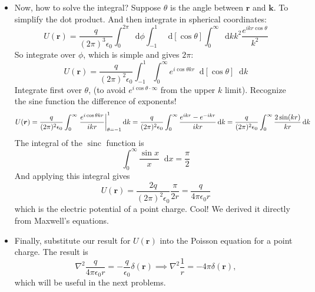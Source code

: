 \documentclass[11pt, a4paper]{article}
\newcommand{\diff}{\mathop{}\!\mathrm{d}} %
\renewcommand{\vec}[1]{\bm{#1}} %
\renewcommand{\r}{\vec{r}}
\newcommand{\e}{\epsilon_{0}}  %
\renewcommand{\laplacian}{\nabla^{2}}
\begin{document}
\begin{itemize}
	\item Now, how to solve the integral? Suppose $ \theta $ is the angle between $ \r $ and $ \vec{k} $. To simplify the dot product. And then integrate in spherical coordinates:
	\begin{equation*}
		U(\r) =  \frac{q}{(2\pi)^{3}\epsilon_{0}} \int_{0}^{2\pi}\diff \phi \int_{-1}^{1} \diff [\cos \theta] \int_{0}^{\infty} \diff k k^{2} \frac{e^{ik r\cos \theta}}{k^{2}} 
	\end{equation*}
	So integrate over $ \phi $, which is simple and gives $ 2\pi $:
	\begin{equation*}
		U(\r) = \frac{q}{(2\pi)^{2}\epsilon_{0}} \int_{-1}^{1}\int_{0}^{\infty} e^{i \cos \theta k r} \diff[\cos \theta] \diff k
	\end{equation*}
	Integrate first over $ \theta $, (to avoid $ e^{i \cos \theta \cdot \infty} $ from the upper $ k $ limit). Recognize the sine function the difference of exponents!
	\begin{equation*}
		U(\r) = \frac{q}{(2\pi)^{2}\epsilon_{0}} \int_{0}^{\infty} \eval{\frac{e^{i \cos \theta k r}}{i k r}}_{\theta = -1}^{1} \diff k = \frac{q}{(2\pi)^{2}\epsilon_{0}} \int_{0}^{\infty}\frac{e^{ikr}-e^{-ikr}}{ikr} \diff k = \frac{q}{(2\pi)^{2}\epsilon_{0}} \int_{0}^{\infty}\frac{2\sin (kr)}{kr} \diff k
	\end{equation*}
	The integral of the $ \operatorname{sinc} $ function is
	\begin{equation*}
		\int_{0}^{\infty} \frac{\sin x}{x}\diff x = \frac{\pi}{2}
	\end{equation*}
	And applying this integral gives
	\begin{equation*}
		U(\r) = \frac{2q}{(2\pi)^{2}\epsilon_{0}}\frac{\pi}{2r} = \frac{q}{4\pi \epsilon_{0}r}
	\end{equation*}
	which is the electric potential of a point charge. Cool! We derived it directly from Maxwell's equations.
	
	\item Finally, substitute our result for $ U(\r) $ into the Poisson equation for a point charge. The result is
	\begin{equation*}
		\laplacian \frac{q}{4\pi \epsilon_{0}r} = -\frac{q}{\e}\delta (\r) \implies \nabla^{2}\frac{1}{r} = - 4\pi \delta(\r),
	\end{equation*}
	which will be useful in the next problems. 
	
\end{itemize}
\end{document}
